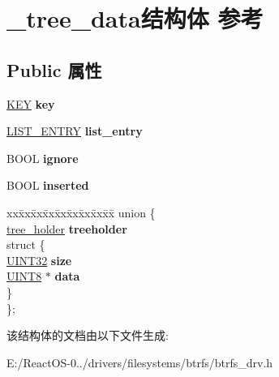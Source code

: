 \hypertarget{struct__tree__data}{}\section{\+\_\+tree\+\_\+data结构体 参考}
\label{struct__tree__data}
\subsection*{Public 属性}
\begin{DoxyCompactItemize}
\item 
\mbox{\label{struct__tree__data_aec85fb7d5246cd4532c9f5bca921e19d}} 
\hyperlink{struct_k_e_y}{K\+EY} {\bfseries key}
\item 
\mbox{\label{struct__tree__data_a40ae83ce91f493e05c67e261ca67d341}} 
\hyperlink{struct___l_i_s_t___e_n_t_r_y}{L\+I\+S\+T\+\_\+\+E\+N\+T\+RY} {\bfseries list\+\_\+entry}
\item 
\mbox{\label{struct__tree__data_a7fc9a529967943ac029b6721e6db1cea}} 
B\+O\+OL {\bfseries ignore}
\item 
\mbox{\label{struct__tree__data_ac8dedf0d6589e842533e08a18e4355e7}} 
B\+O\+OL {\bfseries inserted}
\item 
\mbox{\label{struct__tree__data_ab61c0efe61425d7932880cd81dc7eb6e}} 
\begin{tabbing}
xx\=xx\=xx\=xx\=xx\=xx\=xx\=xx\=xx\=\kill
union \{\\
\>\hyperlink{structtree__holder}{tree\_holder} {\bfseries treeholder}\\
\mbox{\label{union__tree__data_1_1_0D576_a65189bf858c3e51f863a8031157d3bb9}} 
\>struct \{\\
\>\>\hyperlink{_processor_bind_8h_ae1e6edbbc26d6fbc71a90190d0266018}{UINT32} {\bfseries size}\\
\>\>\hyperlink{_processor_bind_8h_ab27e9918b538ce9d8ca692479b375b6a}{UINT8} $\ast$ {\bfseries data}\\
\>\} \\
\}; \\

\end{tabbing}\end{DoxyCompactItemize}


该结构体的文档由以下文件生成\+:\begin{DoxyCompactItemize}
\item 
E\+:/\+React\+O\+S-\/0../drivers/filesystems/btrfs/btrfs\+\_\+drv.\+h\end{DoxyCompactItemize}
